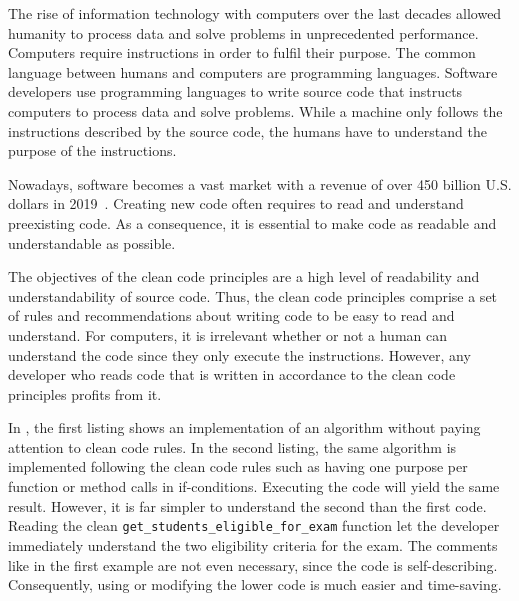 The rise of information technology with computers over the last decades allowed humanity to process data and solve problems in unprecedented performance. Computers require instructions in order to fulfil their purpose. The common language between humans and computers are programming languages. Software developers use programming languages to write source code that instructs computers to process data and solve problems. While a machine only follows the instructions described by the source code, the humans have to understand the purpose of the instructions. 

Nowadays, software becomes a vast market with a revenue of over 450 billion U.S. dollars in 2019~\cite{statista_software_nodate,costello_gartner_2019}. Creating new code often requires to read and understand preexisting code. As a consequence, it is essential to make code as readable and understandable as possible. 

The objectives of the clean code principles are a high level of readability and understandability of source code. Thus, the clean code principles comprise a set of rules and recommendations about writing code to be easy to read and understand. For computers, it is irrelevant whether or not a human can understand the code since they only execute the instructions. However, any developer who reads code that is written in accordance to the clean code principles profits from it. 

In , the first listing shows an implementation of an algorithm without paying attention to clean code rules. In the second listing, the same algorithm is implemented following the clean code rules such as having one purpose per function or method calls in if-conditions. Executing the code will yield the same result. However, it is far simpler to understand the second than the first code. Reading the clean \texttt{get\_students\_eligible\_for\_exam} function let the developer immediately understand the two eligibility criteria for the exam. The comments like in the first example are not even necessary, since the code is self-describing.
Consequently, using or modifying the lower code is much easier and time-saving.

